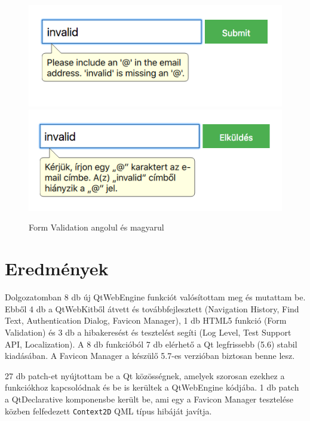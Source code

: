 \documentclass[12pt]{report}
\begin{document}
\begin{figure}[H]
    \centering
    \includegraphics[scale=0.6]{validation-message-english}
    \includegraphics[scale=0.6]{validation-message-magyar}
    \caption{
        \label{fig:validation-message-localization}
        Form Validation angolul és magyarul
    }
\end{figure}


\chapter*{Eredmények}

\enlargethispage{\baselineskip}

Dolgozatomban 8 db új QtWebEngine funkciót valósítottam meg és mutattam be. Ebből 4 db a
QtWebKitből átvett és továbbfejlesztett (Navigation History, Find Text, Authentication
Dialog, Favicon Manager), 1 db HTML5 funkció (Form Validation) és 3 db a hibakeresést és
tesztelést segíti (Log Level, Test Support API, Localization). A 8 db funkcióból 7 db
elérhető a Qt legfrissebb (5.6) stabil kiadásában. A Favicon Manager a készülő 5.7-es
verzióban biztosan benne lesz.

27 db patch-et nyújtottam be a Qt közösségnek, amelyek szorosan ezekhez a funkciókhoz
kapcsolódnak és be is kerültek a QtWebEngine kódjába. 1 db patch a QtDeclarative komponensbe
került be, ami egy a Favicon Manager tesztelése közben felfedezett \texttt{Context2D}
QML típus hibáját javítja.
\end{document}
